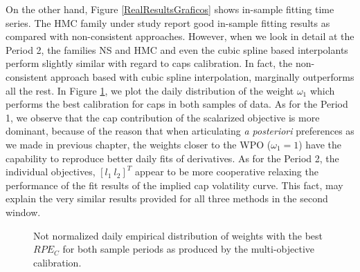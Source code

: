 On the other hand, Figure \ref{RealResultsGraficos} shows in-sample
fitting time series. The HMC family under study report good in-sample 
fitting results as compared with non-consistent approaches. However,
when we look in detail at the Period 2, the families NS and HMC and
even the cubic spline based interpolants perform slightly similar with
regard to caps calibration. In fact, the non-consistent approach based
with cubic spline interpolation, marginally outperforms all the
rest. In Figure \ref{tsWeightsCh6}, we plot the daily distribution of 
the weight $\omega_1$ which performs the best calibration for caps in
both samples of data. As for the Period 1, we observe that the cap
contribution of the scalarized objective is more dominant, because of
the reason that when articulating {\sl a posteriori} preferences as
we made in previous chapter, the weights closer to the WPO
($\omega_1=1$) have the capability to reproduce better daily fits of
derivatives. As for the Period 2, the individual objectives,
$[l_1\:l_2]^T$  appear to be more cooperative relaxing the performance
of the fit results of the implied cap volatility curve. This
fact, may explain the very similar results provided for all three 
methods in the second window.  
\begin{figure}[h!]
\centering
\caption{Not normalized daily empirical distribution of weights with the best $RPE_C$
  for both sample periods as produced by the multi-objective
  calibration. \label{tsWeightsCh6}} 
\end{figure}

